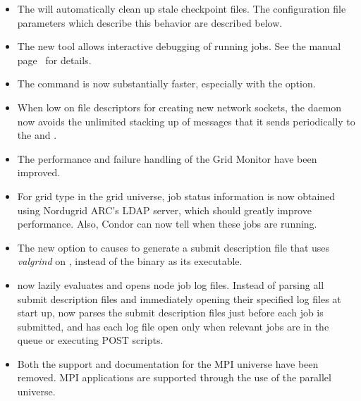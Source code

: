 \begin{itemize}

\item The  will automatically clean up stale
checkpoint files. The configuration file parameters which describe this
behavior are described below.

\item The new  tool allows interactive debugging of running
jobs.  See the manual page~\pageref{man-condor-ssh-to-job} for details.

\item The  command is now substantially faster, 
especially with the  option.

\item When low on file descriptors for creating new network sockets,
the  daemon now avoids the unlimited stacking up of
messages that it sends periodically to the  
and .

\item The performance and failure handling of the Grid Monitor have been
improved.

\item For grid type  in the grid universe,
job status information
is now obtained using Nordugrid ARC's LDAP server, which should greatly
improve performance. Also, Condor can now tell when these jobs are running.

\item The new  option to 
causes  to generate a submit description file that
uses \emph{valgrind} on , instead of the 
binary as its executable.

\item {} now lazily evaluates and opens node job log files.
Instead of parsing all submit description files and 
immediately opening their specified log files at start up,
 now parses
the submit description files just before each job is submitted,
and has each log file open only when relevant jobs are in the queue
or executing POST scripts.

\item Both the support and documentation for the MPI universe have been removed.
MPI applications are supported through the use of the parallel universe.


\end{itemize}
